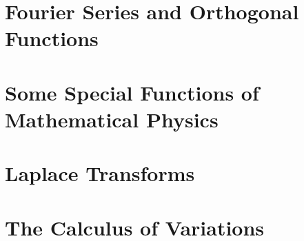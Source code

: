 \documentclass[11pt,a4paper]{article}
\begin{document}
\section{Fourier Series and Orthogonal Functions}


\section{Some Special Functions of Mathematical Physics}




\section{Laplace Transforms}












\section{The Calculus of Variations}
\end{document}
